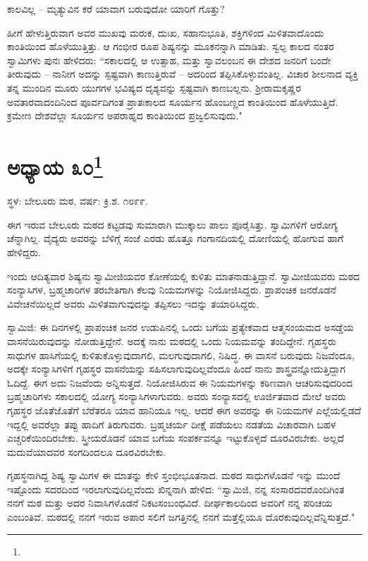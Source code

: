 ಕಾಲವಿಲ್ಲ – ಮೃತ್ಯುವಿನ ಕರೆ ಯಾವಾಗ ಬರುವುದೋ ಯಾರಿಗೆ ಗೊತ್ತು?

ಹೀಗೆ ಹೇಳುತ್ತಿರುವಾಗ ಅವರ ಮುಖವು ಮರುಕ, ದುಃಖ, ಸಹಾನುಭೂತಿ, ಶಕ್ತಿಗಳಿಂದ ಮಿಳಿತವಾದೊಂದು ಕಾಂತಿಯಿಂದ ಹೊಳೆಯುತ್ತಿತ್ತು. ಆ ಗಂಭೀರ ರೂಪ ಶಿಷ್ಯನನ್ನು ಮೂಕನನ್ನಾಗಿ ಮಾಡಿತು. ಸ್ವಲ್ಪ ಕಾಲದ ನಂತರ ಸ್ವಾಮಿಗಳು ಪುನಃ ಹೇಳಿದರು: “ಸಕಾಲದಲ್ಲಿ ಆ ಉತ್ಸಾಹ, ಮತ್ತು ಸ್ವಾವಲಂಬನ ಈ ದೇಶದ ಜನರಿಗೆ ಬಂದೇ ತೀರುವುದು – ನಾನೀಗ ಅದನ್ನು ಸ್ಪಷ್ಟವಾಗಿ ಕಾಣುತ್ತಿರುವೆ – ಅದರಿಂದ ತಪ್ಪಿಸಿಕೊಳ್ಳುವಂತಿಲ್ಲ. ವಿಚಾರ ಶೀಲನಾದ ವ್ಯಕ್ತಿ ತನ್ನ ಮುಂದಿನ ಮೂರು ಯುಗಗಳ ಭವಿಷ್ಯದ ದೃಶ್ಯವನ್ನು ಸ್ಪಷ್ಟವಾಗಿ ಕಾಣಬಲ್ಲನು. ಶ‍್ರೀರಾಮಕೃಷ್ಣರ ಅವತಾರವಾದಂದಿನಿಂದ ಪೂರ್ವದಿಗಂತ ಪ್ರಾತಃಕಾಲದ ಸೂರ್ಯನ ಹೊಂಬಣ್ಣದ ಕಾಂತಿಯಿಂದ ಹೊಳೆಯುತ್ತಿದೆ. ಕ್ರಮೇಣ ದೇಶವೆಲ್ಲಾ ಸೂರ್ಯನ ಅಪರಾಹ್ನದ ಕಾಂತಿಯಿಂದ ಪ್ರಜ್ವಲಿಸುವುದು."

\newpage

\chapter[ಅಧ್ಯಾಯ ೩೦]{ಅಧ್ಯಾಯ ೩೦\protect\footnote{}}

\centerline{ಸ್ಥಳ: ಬೇಲೂರು ಮಠ, ವರ್ಷ: ಕ್ರಿ.ಶ. ೧೮೯೯.}

ಈಗ ಇರುವ ಬೇಲೂರು ಮಠದ ಕಟ್ಟಡವು ಸುಮಾರಾಗಿ ಮುಕ್ಕಾಲು ಪಾಲು ಪೂರೈಸಿತ್ತು. ಸ್ವಾಮಿಗಳಿಗೆ ಆರೋಗ್ಯ ಚೆನ್ನಾಗಿಲ್ಲ. ವೈದ್ಯರು ಅವರನ್ನು ಬೆಳಿಗ್ಗೆ ಸಂಜೆ ಎರಡು ಹೊತ್ತೂ ಗಂಗಾನದಿಯಲ್ಲಿ ದೋಣಿಯಲ್ಲಿ ಹೋಗುವ ಹಾಗೆ ಹೇಳಿದ್ದರು.

ಇಂದು ಆದಿತ್ಯವಾರ ಶಿಷ್ಯನು ಸ್ವಾಮೀಜಿಯವರ ಕೋಣೆಯಲ್ಲಿ ಕುಳಿತು ಮಾತನಾಡುತ್ತಿದ್ದಾನೆ. ಸ್ವಾಮೀಜಿಯವರು ಮಠದ ಸಂನ್ಯಾಸಿಗಳ, ಬ್ರಹ್ಮಚಾರಿಗಳ ತರಬೇತಿಗಾಗಿ ಕೆಲವು ನಿಯಮಗಳನ್ನು ನಿಯೋಜಿಸಿದ್ದರು. ಪ್ರಾಪಂಚಿಕ ಜನರೊಡನೆ ವಿವೇಚನೆಯಿಲ್ಲದೆ ಅವರು ಮಿಳಿತವಾಗುವುದನ್ನು ತಪ್ಪಿಸಲು ಇದನ್ನು ತಯಾರಿಸಿದ್ದರು.

ಸ್ವಾಮಿಜಿ: ಈ ದಿನಗಳಲ್ಲಿ ಪ್ರಾಪಂಚಿಕ ಜನರ ಉಡುಪಿನಲ್ಲಿ ಒಂದು ಬಗೆಯ ಪ್ರತ್ಯೇಕವಾದ ಆತ್ಮಸಂಯಮದ ಅಸಡ್ಡೆಯ ವಾಸನೆಯಿರುವುದನ್ನು ನೋಡುತ್ತಿದ್ದೇನೆ. ಅದಕ್ಕೆ ನಾನು ಮಠದಲ್ಲಿ ಒಂದು ನಿಯಮವನ್ನು ತಂದಿದ್ದೇನೆ. ಗೃಹಸ್ಥರು ಸಾಧುಗಳ ಹಾಸಿಗೆಯಲ್ಲಿ ಕುಳಿತುಕೊಳ್ಳುವುದಾಗಲಿ, ಮಲಗುವುದಾಗಲಿ, ನಿಷಿದ್ಧ. ಈ ವಾಸನೆ ಬರುವುದು ನಿಜವೆಂದೂ, ಅದಕ್ಕೇ ಸಂನ್ಯಾಸಿಗಳಿಗೆ ಗೃಹಸ್ಥರ ವಾಸನೆಯನ್ನು ಸಹಿಸಲಾಗುವುದಿಲ್ಲವೆಂದೂ ಹಿಂದೆ ನಾನು ಶಾಸ್ತ್ರವನ್ನೋದುತ್ತಿದ್ದಾಗ ಓದಿದ್ದೆ. ಈಗ ಅದು ನಿಜವೆಂದು ಅನ್ನಿಸುತ್ತದೆ. ನಿಯೋಜಿಸಿರುವ ಈ ನಿಯಮಗಳನ್ನು ಕಠಿಣವಾಗಿ ಆಚರಿಸುವುದರಿಂದ ಬ್ರಹ್ಮಚಾರಿಗಳು ಸಕಾಲದಲ್ಲಿ ಯೋಗ್ಯ ಸಂನ್ಯಾಸಿಗಳಾಗುವರು. ಅವರು ಸಂನ್ಯಾಸದಲ್ಲಿ ಊರ್ಜಿತವಾದ ಮೇಲೆ ಅವರು ಗೃಹಸ್ಥರ ಜೊತೆಜೊತೆಗೆ ಬೆರೆತರೂ ಯಾವ ಹಾನಿಯೂ ಇಲ್ಲ. ಆದರೆ ಈಗ ಅವರನ್ನು ಈ ನಿಯಮಗಳ ಎಲ್ಲೆಯಲ್ಲಿಡದೆ ಇದ್ದಲ್ಲಿ ಅವರೆಲ್ಲಾ ತಪ್ಪು ಹಾದಿಗೆ ತಿರುಗುವರು. ಬ್ರಹ್ಮಚರ್ಯ ದೀಕ್ಷೆ ಪಡೆಯಲು ನಡತೆಯ ವಿಚಾರವಾಗಿ ಬಹಳ ಎಚ್ಚರಿಕೆಯಿಂದಿರಬೇಕು. ಸ್ತ್ರೀಯರೊಡನೆ ಯಾವ ಬಗೆಯ ಸಂಪರ್ಕವನ್ನೂ ಇಟ್ಟುಕೊಳ್ಳದೆ ದೂರವಿರಬೇಕು. ಅಲ್ಲದೆ ಮದುವೆಯಾದವರ ಸಂಗದಿಂದಲೂ ದೂರವಿರಬೇಕು.

ಗೃಹಸ್ಥನಾಗಿದ್ದ ಶಿಷ್ಯ ಸ್ವಾಮಿಗಳ ಈ ಮಾತನ್ನು ಕೇಳಿ ಸ್ತಂಭೀಭೂತನಾದ. ಮಠದ ಸಾಧುಗಳೊಡನೆ ಇನ್ನು ಮುಂದೆ ಇಷ್ಟೊಂದು ಸದರದಿಂದ ಇರಲಾಗುವುದಿಲ್ಲವೆಂದು ಖಿನ್ನನಾಗಿ ಹೇಳಿದ: “ಸ್ವಾಮಿಜಿ, ನನ್ನ ಸಂಸಾರದವರೊಂದಿಗಿಂತ ನನಗೆ ಮಠ ಮತ್ತು ಅದರ ನಿವಾಸಿಗಳೊಡನೆ ನಿಕಟಸಂಬಂಧವಿದೆ. ದೀರ್ಘಕಾಲದಿಂದ ಅವರಿಗೆ ನನ್ನ ಪರಿಚಯ ಎಂಬಂತಿವೆ. ಮಠದಲ್ಲಿ ನನಗೆ ಇರುವ ಅಪಾರ ಸಲಿಗೆ ಜಗತ್ತಿನಲ್ಲಿ ನನಗೆ ಮತ್ತೆಲ್ಲಿಯೂ ದೊರಕುವುದಿಲ್ಲವೆನ್ನಿಸುತ್ತದೆ."

